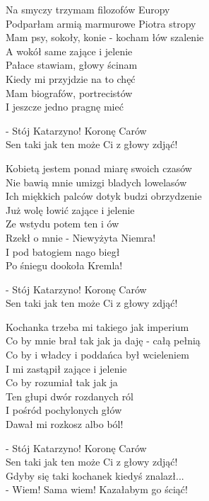 \begin{text}
    Na smyczy trzymam filozofów Europy\\
    Podparłam armią marmurowe Piotra stropy\\
    Mam psy, sokoły, konie - kocham łów szalenie\\
    A wokół same zające i jelenie\\
    Pałace stawiam, głowy ścinam\\
    Kiedy mi przyjdzie na to chęć\\
    Mam biografów, portrecistów\\
    I jeszcze jedno pragnę mieć

    \vin - Stój Katarzyno! Koronę Carów\\
    \vin Sen taki jak ten może Ci z głowy zdjąć!

    Kobietą jestem ponad miarę swoich czasów\\
    Nie bawią mnie umizgi bladych lowelasów\\
    Ich miękkich palców dotyk budzi obrzydzenie\\
    Już wolę łowić zające i jelenie\\
    Ze wstydu potem ten i ów\\
    Rzekł o mnie - Niewyżyta Niemra!\\
    I pod batogiem nago biegł\\
    Po śniegu dookoła Kremla!

    \vin - Stój Katarzyno! Koronę Carów\\
    \vin Sen taki jak ten może Ci z głowy zdjąć!

    Kochanka trzeba mi takiego jak imperium\\
    Co by mnie brał tak jak ja daję - całą pełnią\\
    Co by i władcy i poddańca był wcieleniem\\
    I mi zastąpił zające i jelenie\\
    Co by rozumiał tak jak ja\\
    Ten głupi dwór rozdanych ról\\
    I pośród pochylonych głów\\
    Dawał mi rozkosz albo ból!

    \vin - Stój Katarzyno! Koronę Carów\\
    \vin Sen taki jak ten może Ci z głowy zdjąć!\\
    \vin Gdyby się taki kochanek kiedyś znalazł...\\
    \vin - Wiem! Sama wiem! Kazałabym go ściąć!
\end{text}
